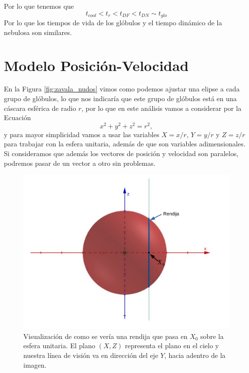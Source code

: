 \documentclass{book}
\begin{document}
Por lo que tenemos que
\begin{equation}
    t_{cool} < t_r < t_{DF} < t_{DN} \sim t_{glo}
\end{equation}
Por lo que los tiempos de vida de los glóbulos y el tiempo dinámico de la nebulosa son similares. 

\chapter{Modelo Posición-Velocidad}

En la Figura \ref{fig:zavala_nudos} vimos como podemos ajustar una elipse a cada grupo de glóbulos, lo que nos indicaría que este grupo de glóbulos está en una cáscara esférica de radio $r$, por lo que en este análisis vamos a considerar por la Ecuación
\begin{equation}
	x^2+y^2+z^2=r^2,
\end{equation}
y para mayor simplicidad vamos a usar las variables $X=x/r$, $Y=y/r$ y $Z=z/r$ para trabajar con la esfera unitaria, además de que son variables adimensionales. Si consideramos que además los vectores de posición y velocidad son paralelos, podremos pasar de un vector a otro sin problemas.


\begin{figure}
    \centering
    \includegraphics[width=\textwidth]{imagenes_corregidas/n_esfe_01.pdf}
    \caption{Visualización de como se vería una rendija que pasa en $X_0$ sobre la esfera unitaria. El plano $(X,Z)$ representa el plano en el cielo y nuestra línea de visión va en dirección del eje $Y$, hacia adentro de la imagen.}
    \label{fig: ap PV rendija}
\end{figure}
\end{document}
